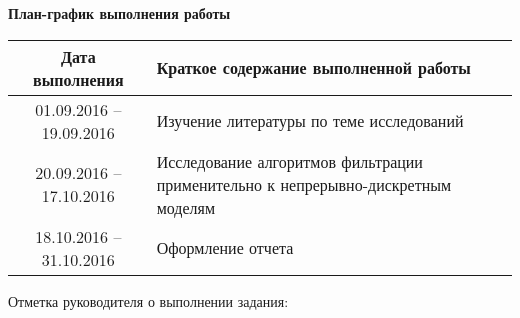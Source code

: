 \documentclass[a4paper,14pt]{extarticle}
\begin{document}
\begin{center}
\textbf{План-график выполнения работы}
\bigbreak
\begin{tabularx}{\linewidth}{|c|X|}
	\hline
	Дата выполнения & Краткое содержание выполненной работы \\ \hline
	01.09.2016 -- 19.09.2016 & Изучение литературы по теме исследований \\ \hline
	20.09.2016 -- 17.10.2016 & Исследование алгоритмов фильтрации применительно к
	непрерывно-дискретным моделям \\ \hline
	18.10.2016 -- 31.10.2016 & Оформление отчета \\ \hline
\end{tabularx}
\end{center}

\noindent Отметка руководителя о выполнении задания:
\end{document}
